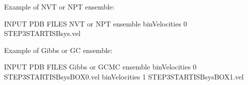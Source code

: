 \documentclass[letterpaper,10pt,english]{sphinxmanual}
\begin{document}
\begin{description}
\sphinxAtStartPar
Example of NVT or NPT ensemble:

\begin{sphinxVerbatim}[commandchars=\\\{\}]
\PYGZsh{}\PYGZsh{}\PYGZsh{}\PYGZsh{}\PYGZsh{}\PYGZsh{}\PYGZsh{}\PYGZsh{}\PYGZsh{}\PYGZsh{}\PYGZsh{}\PYGZsh{}\PYGZsh{}\PYGZsh{}\PYGZsh{}\PYGZsh{}\PYGZsh{}\PYGZsh{}\PYGZsh{}\PYGZsh{}\PYGZsh{}\PYGZsh{}\PYGZsh{}\PYGZsh{}\PYGZsh{}\PYGZsh{}\PYGZsh{}\PYGZsh{}\PYGZsh{}\PYGZsh{}\PYGZsh{}\PYGZsh{}\PYGZsh{}\PYGZsh{}\PYGZsh{}\PYGZsh{}\PYGZsh{}\PYGZsh{}\PYGZsh{}\PYGZsh{}\PYGZsh{}\PYGZsh{}\PYGZsh{}\PYGZsh{}\PYGZsh{}
\PYGZsh{} INPUT PDB FILES \PYGZhy{} NVT or NPT ensemble
\PYGZsh{}\PYGZsh{}\PYGZsh{}\PYGZsh{}\PYGZsh{}\PYGZsh{}\PYGZsh{}\PYGZsh{}\PYGZsh{}\PYGZsh{}\PYGZsh{}\PYGZsh{}\PYGZsh{}\PYGZsh{}\PYGZsh{}\PYGZsh{}\PYGZsh{}\PYGZsh{}\PYGZsh{}\PYGZsh{}\PYGZsh{}\PYGZsh{}\PYGZsh{}\PYGZsh{}\PYGZsh{}\PYGZsh{}\PYGZsh{}\PYGZsh{}\PYGZsh{}\PYGZsh{}\PYGZsh{}\PYGZsh{}\PYGZsh{}\PYGZsh{}\PYGZsh{}\PYGZsh{}\PYGZsh{}\PYGZsh{}\PYGZsh{}\PYGZsh{}\PYGZsh{}\PYGZsh{}\PYGZsh{}\PYGZsh{}\PYGZsh{}
binVelocities   0   STEP3\PYGZus{}START\PYGZus{}ISB\PYGZus{}sys.vel
\end{sphinxVerbatim}

\sphinxAtStartPar
Example of Gibbs or GC ensemble:

\begin{sphinxVerbatim}[commandchars=\\\{\}]
\PYGZsh{}\PYGZsh{}\PYGZsh{}\PYGZsh{}\PYGZsh{}\PYGZsh{}\PYGZsh{}\PYGZsh{}\PYGZsh{}\PYGZsh{}\PYGZsh{}\PYGZsh{}\PYGZsh{}\PYGZsh{}\PYGZsh{}\PYGZsh{}\PYGZsh{}\PYGZsh{}\PYGZsh{}\PYGZsh{}\PYGZsh{}\PYGZsh{}\PYGZsh{}\PYGZsh{}\PYGZsh{}\PYGZsh{}\PYGZsh{}\PYGZsh{}\PYGZsh{}\PYGZsh{}\PYGZsh{}\PYGZsh{}\PYGZsh{}\PYGZsh{}\PYGZsh{}\PYGZsh{}\PYGZsh{}\PYGZsh{}\PYGZsh{}\PYGZsh{}\PYGZsh{}\PYGZsh{}\PYGZsh{}\PYGZsh{}\PYGZsh{}
\PYGZsh{} INPUT PDB FILES \PYGZhy{} Gibbs or GCMC ensemble
\PYGZsh{}\PYGZsh{}\PYGZsh{}\PYGZsh{}\PYGZsh{}\PYGZsh{}\PYGZsh{}\PYGZsh{}\PYGZsh{}\PYGZsh{}\PYGZsh{}\PYGZsh{}\PYGZsh{}\PYGZsh{}\PYGZsh{}\PYGZsh{}\PYGZsh{}\PYGZsh{}\PYGZsh{}\PYGZsh{}\PYGZsh{}\PYGZsh{}\PYGZsh{}\PYGZsh{}\PYGZsh{}\PYGZsh{}\PYGZsh{}\PYGZsh{}\PYGZsh{}\PYGZsh{}\PYGZsh{}\PYGZsh{}\PYGZsh{}\PYGZsh{}\PYGZsh{}\PYGZsh{}\PYGZsh{}\PYGZsh{}\PYGZsh{}\PYGZsh{}\PYGZsh{}\PYGZsh{}\PYGZsh{}\PYGZsh{}\PYGZsh{}
binVelocities   0   STEP3\PYGZus{}START\PYGZus{}ISB\PYGZus{}sys\PYGZus{}BOX\PYGZus{}0.vel
binVelocities   1   STEP3\PYGZus{}START\PYGZus{}ISB\PYGZus{}sys\PYGZus{}BOX\PYGZus{}1.vel
\end{sphinxVerbatim}


\end{description}
\end{document}
